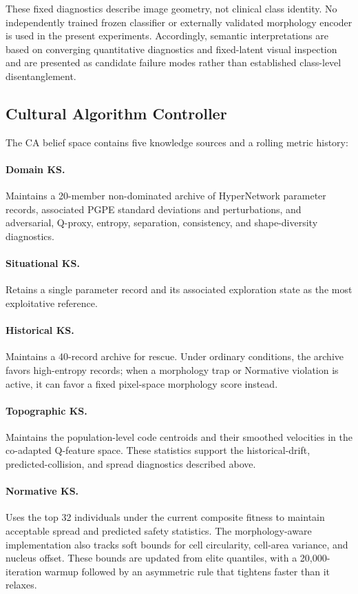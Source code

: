 These fixed diagnostics describe image geometry, not clinical class identity. No independently trained frozen classifier or externally validated morphology encoder is used in the present experiments. Accordingly, semantic interpretations are based on converging quantitative diagnostics and fixed-latent visual inspection and are presented as candidate failure modes rather than established class-level disentanglement.

\subsection{Cultural Algorithm Controller}

The CA belief space contains five knowledge sources and a rolling metric history:

\paragraph{Domain KS.}
Maintains a 20-member non-dominated archive of HyperNetwork parameter records, associated PGPE standard deviations and perturbations, and adversarial, Q-proxy, entropy, separation, consistency, and shape-diversity diagnostics.

\paragraph{Situational KS.}
Retains a single parameter record and its associated exploration state as the most exploitative reference.

\paragraph{Historical KS.}
Maintains a 40-record archive for rescue. Under ordinary conditions, the archive favors high-entropy records; when a morphology trap or Normative violation is active, it can favor a fixed pixel-space morphology score instead.

\paragraph{Topographic KS.}
Maintains the population-level code centroids and their smoothed velocities in the co-adapted Q-feature space. These statistics support the historical-drift, predicted-collision, and spread diagnostics described above.

\paragraph{Normative KS.}
Uses the top 32 individuals under the current composite fitness to maintain acceptable spread and predicted safety statistics. The morphology-aware implementation also tracks soft bounds for cell circularity, cell-area variance, and nucleus offset. These bounds are updated from elite quantiles, with a 20,000-iteration warmup followed by an asymmetric rule that tightens faster than it relaxes.

